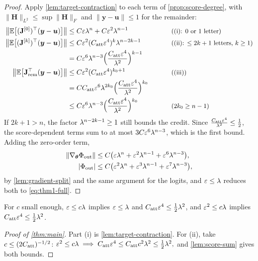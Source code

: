\begin{proof}
Apply \cref{lem:target-contraction} to each term of \cref{prop:score-degree}, with $\|\mathbf H\|_{L^2}\le\sup\|\mathbf H\|_F$ and $\|\bm y-\bm u\|\le1$ for the remainder:
\begin{alignat*}{2}
 \bigl\|\E\bigl[(\mathbf J^{[0]})^\top(\bm y-\bm u)\bigr]\bigr\|&\le C\initscale\mixrate^n+C\initscale^2\mixrate^{n-1} &\qquad& \why{(i): $0$ or $1$ letter}\\
 \bigl\|\E\bigl[(\mathbf J^{[k]})^\top(\bm y-\bm u)\bigr]\bigr\|&\le C\initscale^2(\attconst\initscale^4)^k\mixrate^{n-2k-1} && \why{(ii): $\le2k+1$ letters, $k\ge1$}\\
 &=C\initscale^6\mixrate^{n-3}\Bigl(\frac{\attconst\initscale^4}{\mixrate^2}\Bigr)^{k-1} && \\
 \bigl\|\E\bigl[\mathbf J_{\mathrm{rem}}^\top(\bm y-\bm u)\bigr]\bigr\|&\le C\initscale^2(\attconst\initscale^4)^{k_0+1} && \why{(iii)}\\
 &=C\attconst\initscale^6\mixrate^{2k_0}\Bigl(\frac{\attconst\initscale^4}{\mixrate^2}\Bigr)^{k_0} && \\
 &\le C\initscale^6\mixrate^{n-3}\Bigl(\frac{\attconst\initscale^4}{\mixrate^2}\Bigr)^{k_0} && \why{$2k_0\ge n-1$}
\end{alignat*}
If $2k+1>n$, the factor $\lambda^{n-2k-1}\ge1$ still bounds the credit. Since $\frac{C_{\mathrm{att}}\varepsilon^4}{\lambda^2}\le\frac{1}{2}$, the
score-dependent terms sum to at most $3C\varepsilon^6\lambda^{n-3}$, which is the first bound. Adding the zero-order term,
\begin{align*}
 \|\nabla_{\bm\theta}\Phi_{\mathrm{out}}\|&\le C\bigl(\varepsilon\lambda^n+\varepsilon^2\lambda^{n-1}+\varepsilon^6\lambda^{n-3}\bigr),\\
 |\Phi_{\mathrm{out}}|&\le C\bigl(\varepsilon^2\lambda^n+\varepsilon^3\lambda^{n-1}+\varepsilon^7\lambda^{n-3}\bigr),
\end{align*}
by \cref{lem:gradient-split} and the same argument for the logits, and $\varepsilon\le\lambda$ reduces both to \cref{eq:thm1-full}.
\end{proof}

For $c$ small enough, $\varepsilon\le c\lambda$ implies $\varepsilon\le\lambda$ and $C_{\mathrm{att}}\varepsilon^4\le\frac{1}{2}\lambda^2$, and $\varepsilon^2\le c\lambda$ implies $C_{\mathrm{att}}\varepsilon^4\le\frac{1}{2}\lambda^2$.

\begin{proof}[Proof of \cref{thm:main}]
Part (i) is \cref{lem:target-contraction}. For (ii), take $c\le(2C_{\mathrm{att}})^{-1/2}$:
 $\initscale^2\le c\mixrate\implies \attconst\initscale^4\le\attconst c^2\mixrate^2\le\tfrac{1}{2}\mixrate^2,$ 
and \cref{lem:score-sum} gives both bounds.
\end{proof}

